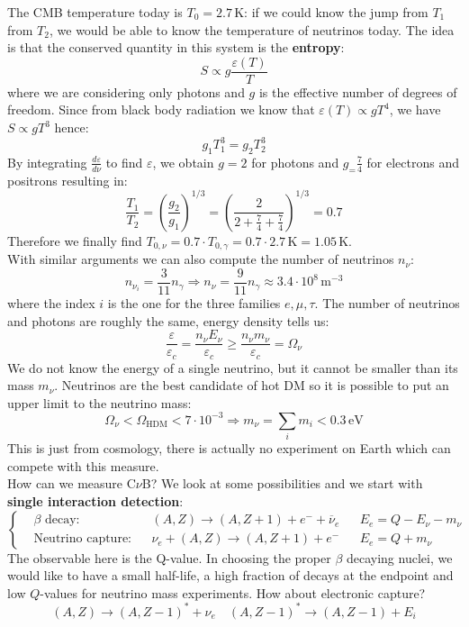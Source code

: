 \documentclass[10.75pt,a4paper,openright,bottom=2cm]{article}
\begin{document}
The CMB temperature today is $T_0=2.7$\,K: if we could know the jump from $T_1$ from $T_2$, we would be able to know the temperature of neutrinos today. The idea is that the conserved quantity in this system is the \textbf{entropy}:
\[
S\propto g\frac{\varepsilon(T)}{T}
\]
where we are considering only photons and $g$ is the effective number of degrees of freedom. Since from black body radiation we know that $\varepsilon(T)\propto gT^4$, we have $S\propto gT^3$ hence:
\[
g_1T_1^3=g_2T_2^3
\]
By integrating $\frac{d\varepsilon}{d\nu}$ to find $\varepsilon$, we obtain $g=2$ for photons and $g_=\frac{7}{4}$ for electrons and positrons  resulting in:
\[
\frac{T_1}{T_2}=\left(\frac{g_2}{g_1}\right)^{1/3}=\left(\frac{2}{2+\frac{7}{4}+\frac{7}{4}}\right)^{1/3}=0.7
\]
Therefore we finally find $T_{0,\nu}=0.7\cdot T_{0,\gamma}=0.7\cdot2.7$\,K$=1.05$\,K.\\
With similar arguments we can also compute the number of neutrinos $n_\nu$:
\[
n_{\nu_i}=\frac{3}{11}n_\gamma\Rightarrow n_\nu=\frac{9}{11}n_\gamma\approx3.4\cdot10^8\,\text{m$^{-3}$}
\]
where the index $i$ is the one for the three families $e,\mu,\tau$. The number of neutrinos and photons are roughly the same, energy density tells us:
\[
\frac{\varepsilon}{\varepsilon_c}=\frac{n_\nu E_\nu}{\varepsilon_c}\ge\frac{n_\nu m_\nu}{\varepsilon_c}=\Omega_\nu
\]
We do not know the energy of a single neutrino, but it cannot be smaller than its mass $m_\nu$. Neutrinos are the best candidate of hot DM so it is possible to put an upper limit to the neutrino mass:
\[
\Omega_\nu<\Omega_{\text{HDM}}<7\cdot10^{-3}\Rightarrow m_\nu=\sum_im_i<0.3\,\text{eV}
\]
This is just from cosmology, there is actually no experiment on Earth which can compete with this measure.\\
How can we measure C$\nu$B? We look at some possibilities and we start with \textbf{single interaction detection}:
\[
\left\{
\begin{aligned}
&\text{$\beta$ decay}: &&(A,Z)\to(A,Z+1)+e^-+\overline{\nu}_e &&E_e=Q-E_\nu-m_\nu\\
&\text{Neutrino capture}: &&\nu_e+(A,Z)\to(A,Z+1)+e^- &&E_e=Q+m_\nu
\end{aligned}
\right.
\]
The observable here is the Q-value. In choosing the proper $\beta$ decaying nuclei, we would like to have a small half-life, a high fraction of decays at the endpoint and low $Q$-values for neutrino mass experiments. How about electronic capture?
\[
(A,Z)\to(A,Z-1)^*+\nu_e \quad (A,Z-1)^*\to(A,Z-1)+E_i
\]
\end{document}
